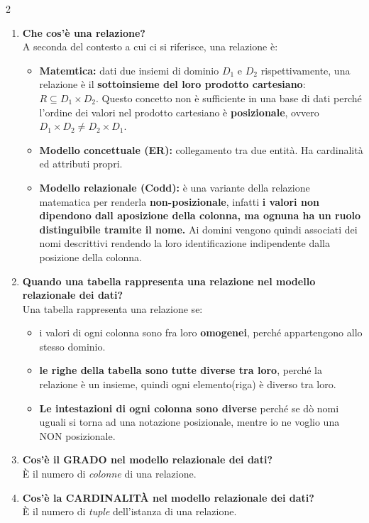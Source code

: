 \documentclass{article}
\newcommand{\sitemize}[1]{%
  \begin{itemize}[label=$\diamond$]
    #1
  \end{itemize}
}
\begin{document}
\begin{multicols}{2}
\begin{enumerate}[leftmargin=*, align=left]
		\item \textbf{Che cos'è una relazione?} \\
		A seconda del contesto a cui ci si riferisce, una relazione è:\sitemize{\item \textbf{Matemtica:} dati due insiemi di dominio $D_1$ e $D_2$ rispettivamente, una relazione è il \textbf{sottoinsieme del loro prodotto cartesiano}: $R\subseteq D_1 \times D_2$. Questo concetto non è sufficiente in una base di dati perché l'ordine dei valori nel prodotto cartesiano è \textbf{posizionale}, ovvero $D_1 \times D_2 \neq D_2 \times D_1$.
			\item \textbf{Modello concettuale (ER):} collegamento tra due entità. Ha cardinalità ed attributi propri.
			\item \textbf{Modello relazionale (Codd):} è una variante della relazione matematica per renderla \textbf{non-posizionale}, infatti \textbf{i valori non dipendono dall aposizione della colonna, ma ognuna ha un ruolo distinguibile tramite il nome.} Ai domini vengono quindi associati dei nomi descrittivi rendendo la loro identificazione indipendente dalla posizione della colonna. 
			
		} 
		
		\item \textbf{Quando una tabella rappresenta una relazione nel modello relazionale dei dati?}\\
		Una tabella rappresenta una relazione se: \sitemize{\item i valori di ogni colonna sono fra loro \textbf{omogenei}, perché appartengono allo stesso dominio.
			\item \textbf{le righe della tabella sono tutte diverse tra loro}, perché la relazione è un insieme, quindi ogni elemento(riga) è diverso tra loro.
			\item \textbf{Le intestazioni di ogni colonna sono diverse} perché se dò nomi uguali si torna ad una notazione posizionale, mentre io ne voglio una NON posizionale. }
		
		\item \textbf{Cos'è il GRADO nel modello relazionale dei dati?}\\
		È il numero di \textit{colonne} di una relazione.
		
		\item \textbf{Cos'è la CARDINALITÀ nel modello relazionale dei dati?}\\
		È il numero di \textit{tuple} dell'istanza di una relazione.
		

\end{enumerate}
\end{multicols}
\end{document}
